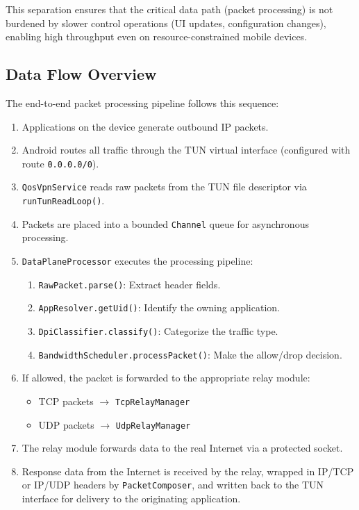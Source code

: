 This separation ensures that the critical data path (packet processing) is not burdened by slower control operations (UI updates, configuration changes), enabling high throughput even on resource-constrained mobile devices.

\subsection{Data Flow Overview}

The end-to-end packet processing pipeline follows this sequence:

\begin{enumerate}
    \item Applications on the device generate outbound IP packets.
    \item Android routes all traffic through the TUN virtual interface (configured with route \texttt{0.0.0.0/0}).
    \item \texttt{QosVpnService} reads raw packets from the TUN file descriptor via \texttt{runTunReadLoop()}.
    \item Packets are placed into a bounded \texttt{Channel} queue for asynchronous processing.
    \item \texttt{DataPlaneProcessor} executes the processing pipeline:
    \begin{enumerate}[label=\alph*.]
        \item \texttt{RawPacket.parse()}: Extract header fields.
        \item \texttt{AppResolver.getUid()}: Identify the owning application.
        \item \texttt{DpiClassifier.classify()}: Categorize the traffic type.
        \item \texttt{BandwidthScheduler.processPacket()}: Make the allow/drop decision.
    \end{enumerate}
    \item If allowed, the packet is forwarded to the appropriate relay module:
    \begin{itemize}
        \item TCP packets $\rightarrow$ \texttt{TcpRelayManager}
        \item UDP packets $\rightarrow$ \texttt{UdpRelayManager}
    \end{itemize}
    \item The relay module forwards data to the real Internet via a protected socket.
    \item Response data from the Internet is received by the relay, wrapped in IP/TCP or IP/UDP headers by \texttt{PacketComposer}, and written back to the TUN interface for delivery to the originating application.
\end{enumerate}

